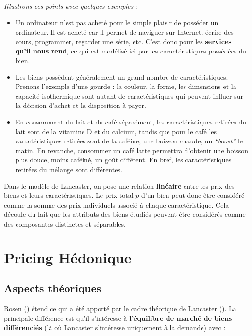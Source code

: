 \documentclass[
  12pt,
]{report}
\begin{document}
\emph{Illustrons ces points avec quelques exemples} :

\begin{itemize}
\item
  Un ordinateur n'est pas acheté pour le simple plaisir de posséder un
  ordinateur. Il est acheté car il permet de naviguer sur Internet,
  écrire des cours, programmer, regarder une série, etc. C'est donc pour
  les \textbf{services qu'il nous rend}, ce qui est modélisé ici par les
  caractéristiques possédées du bien.
\item
  Les biens possèdent généralement un grand nombre de caractéristiques.
  Prenons l'exemple d'une gourde : la couleur, la forme, les dimensions
  et la capacité isothermique sont autant de caractéristiques qui
  peuvent influer sur la décision d'achat et la disposition à payer.
\item
  En consommant du lait et du café séparément, les caractéristiques
  retirées du lait sont de la vitamine D et du calcium, tandis que pour
  le café les caractéristiques retirées sont de la caféine, une boisson
  chaude, un \emph{``boost''} le matin. En revanche, consommer un café
  latte permettra d'obtenir une boisson plus douce, moins caféiné, un
  goût différent. En bref, les caractéristiques retirées du mélange sont
  différentes.
\end{itemize}

Dans le modèle de Lancaster, on pose une relation \textbf{linéaire}
entre les prix des biens et leurs caractéristiques. Le prix total \(p\)
d'un bien peut donc être considéré comme la somme des prix individuels
associé à chaque caractéristique. Cela découle du fait que les attributs
des biens étudiés peuvent être considérés comme des composantes
distinctes et séparables.

\section{Pricing Hédonique}\label{pricing-huxe9donique}

\subsection{Aspects théoriques}\label{aspects-thuxe9oriques}

Rosen () étend ce qui a été apporté par le
cadre théorique de Lancaster (). La
principale différence est qu'il s'intéresse à \textbf{l'équilibre de
marché de biens différenciés} (là où Lancaster s'intéresse uniquement à
la demande) avec :
\end{document}
